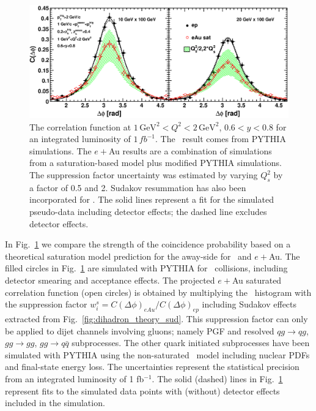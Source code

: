 \begin{figure}[hbt]
\begin{center}
\includegraphics[width=1.0\textwidth]{plots/chpt6/Q2_1_y_0.7_varying_Qs_uncertainty_Sud_withfit_smear.eps} 
\end{center} 
\caption[correlation function with saturation scale uncertainty]{The correlation
function at $1\, \textrm{GeV}^{2}<Q^{2}<2 \, \textrm{GeV}^{2}$, $0.6<y<0.8$ for an  
integrated luminosity of $1 \, fb^{-1}$. The \ep\ result comes from PYTHIA simulations.
The $e+$Au results are a combination of simulations from a saturation-based model plus modified
PYTHIA simulations. The suppression factor uncertainty was estimated by varying
$Q_{s}^{2}$ by a factor of 0.5 and 2. Sudakov resummation has also been incorporated
for \eAu. The solid lines represent a fit for the simulated pseudo-data
including detector effects; the dashed line excludes detector effects.}
\label{fig:correUncertainSud}
\end{figure}

In Fig.~\ref{fig:correUncertainSud} we compare the strength of the
coincidence probability based on a theoretical saturation model prediction for
the away-side for \ep\ and $e+$Au. The filled circles in
Fig.~\ref{fig:correUncertainSud} are simulated with PYTHIA
for \ep\ collisions, including detector smearing and acceptance effects.
The projected $e+$Au saturated correlation function (open circles) is
obtained by multiplying the \ep\ histogram with the suppression factor
$w^{s}_{i}=C(\Delta\phi)_{eAu}/C(\Delta\phi)_{ep}$ including Sudakov effects extracted
from Fig.~\ref{fig:dihadron_theory_sud}. This suppression factor can only be applied to
dijet channels involving gluons; namely PGF and resolved $qg\rightarrow qg$,
$gg\rightarrow gg$, $gg\rightarrow q\bar q$ subprocesses. The other quark
initiated subprocesses have been simulated with PYTHIA using the non-saturated
\eA\ model including nuclear PDFs and final-state energy loss. The uncertainties
represent the statistical precision from an integrated luminosity of 1
fb$^{-1}$. The solid (dashed) lines in Fig.~\ref{fig:correUncertainSud} represent
fits to the simulated data points with (without) detector effects included in
the simulation.


